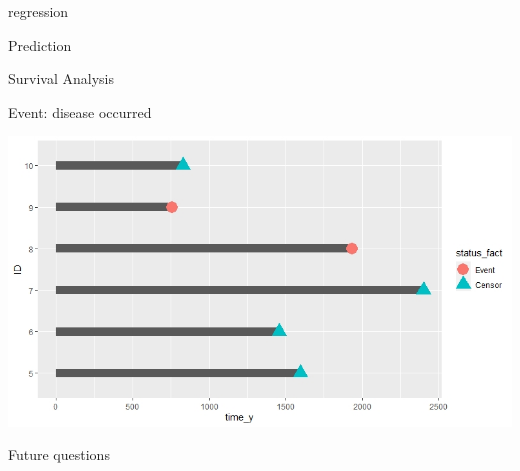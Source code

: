 \documentclass{beamer}
\begin{document}
\begin{frame}{regression}



\end{frame}

\begin{frame}{Prediction}

\end{frame}

\begin{frame}{Survival Analysis}

\vspace{0.3 cm}
Event: disease occurred

	\begin{center}
		\includegraphics[width=0.9\columnwidth]{survival_plot2.jpeg}
	\end{center}
\end{frame}

\begin{frame}{Future questions}

\end{frame}
\end{document}
